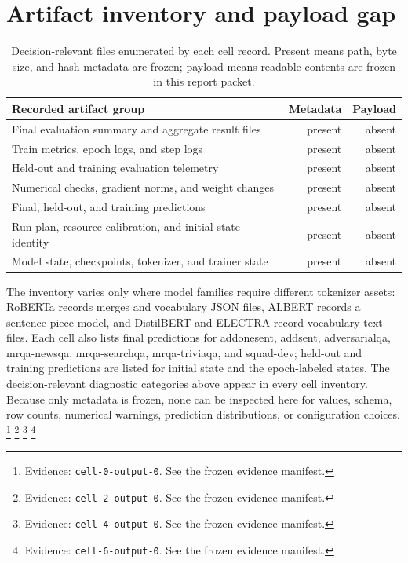 \documentclass[10pt,twocolumn,letterpaper]{article}
\begin{document}
\section{Artifact inventory and payload gap}\label{artifact-inventory}
\begin{table}[H]\centering\normalsize
\caption{Decision-relevant files enumerated by each cell record. Present means path, byte size, and hash metadata are frozen; payload means readable contents are frozen in this report packet.}
\begin{tabularx}{\textwidth}{@{}Xrr@{}}
\toprule
Recorded artifact group & Metadata & Payload \\ \midrule
Final evaluation summary and aggregate result files & present & absent \\
Train metrics, epoch logs, and step logs & present & absent \\
Held-out and training evaluation telemetry & present & absent \\
Numerical checks, gradient norms, and weight changes & present & absent \\
Final, held-out, and training predictions & present & absent \\
Run plan, resource calibration, and initial-state identity & present & absent \\
Model state, checkpoints, tokenizer, and trainer state & present & absent \\
\bottomrule\end{tabularx}\end{table}
The inventory varies only where model families require different tokenizer assets: RoBERTa records merges and vocabulary JSON files, ALBERT records a sentence-piece model, and DistilBERT and ELECTRA record vocabulary text files. Each cell also lists final predictions for addonesent, addsent, adversarialqa, mrqa-newsqa, mrqa-searchqa, mrqa-triviaqa, and squad-dev; held-out and training predictions are listed for initial state and the epoch-labeled states. The decision-relevant diagnostic categories above appear in every cell inventory. Because only metadata is frozen, none can be inspected here for values, schema, row counts, numerical warnings, prediction distributions, or configuration choices. \footnote{Evidence: \texttt{cell-0-output-0}. See the frozen evidence manifest.} \footnote{Evidence: \texttt{cell-2-output-0}. See the frozen evidence manifest.} \footnote{Evidence: \texttt{cell-4-output-0}. See the frozen evidence manifest.} \footnote{Evidence: \texttt{cell-6-output-0}. See the frozen evidence manifest.}
\end{document}
